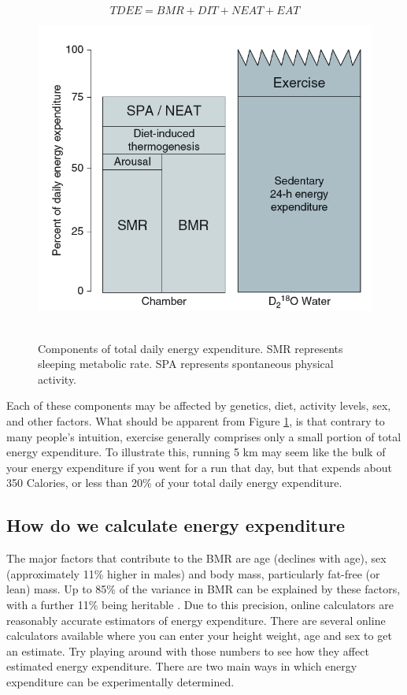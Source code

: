 \documentclass{tufte-handout}
\begin{document}
\begin{equation}
TDEE = BMR + DIT + NEAT + EAT
\end{equation}

\begin{figure}
\includegraphics{figures/tdee-components.png}\
\caption{Components of total daily energy expenditure.  SMR represents sleeping metabolic rate. SPA represents spontaneous physical activity.}
\label{fig:tdee-components}
\end{figure}

Each of these components may be affected by genetics, diet, activity levels, sex, and other factors.  What should be apparent from Figure \ref{fig:tdee-components}, is that contrary to many people's intuition, exercise generally comprises only a small portion of total energy expenditure.  To illustrate this, running 5 km may seem like the bulk of your energy expenditure if you went for a run that day, but that expends about 350 Calories, or less than  20\% of your total daily energy expenditure.  

\subsection{How do we calculate energy expenditure}

The major factors that contribute to the BMR are age (declines with age), sex (approximately 11\% higher in males) and body mass, particularly fat-free (or lean) mass.  Up to 85\% of the variance in BMR can be explained by these factors, with a further 11\% being heritable \citep{Bogardus1986a}.  Due to this precision, online calculators are reasonably accurate estimators of energy expenditure.  There are several online calculators available where you can enter your height weight, age and sex to get an estimate.  Try playing around with those numbers to see how they affect estimated energy expenditure.  There are two main ways in which energy expenditure can be experimentally determined.
\end{document}
